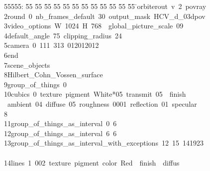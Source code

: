 %
%
\begin{tabbing}
55555: \= 55 \= 55 \= 55 \= 55 \= 55 \= 55 \= 55 \= 55 \= 55 \= 55 \= 55 \= 55 \= \>\>orbiterout\ v\ 2\ povray\ \\[0pt]
2\>\>\>round\ 0\ nb\_frames\_default\ 30\ output\_mask\ HCV\_d\_03dpov\ \\[0pt]
3\>\>\>video\_options\ W\ 1024\ H\ 768\ \ global\_picture\_scale\ 09\ \\[0pt]
4\>\>\>default\_angle\ 75\ clipping\_radius\ 24\ \\[0pt]
5\>\>\>camera\ 0\ 111\ 313\ 012012012\ \ \\[0pt]
6\>\>\>end\ \\[0pt]
7\>\>\>scene\_objects\ \\[0pt]
8\>\>\>\>Hilbert\_Cohn\_Vossen\_surface\ \\[0pt]
9\>\>\>\>group\_of\_things\ 0\ \\[0pt]
10\>\>\>\>cubics\ 0\ texture\ pigment\ White*05\ transmit\ 05\ \ finish\\[0pt]
\>\ ambient\ 04\ diffuse\ 05\ roughness\ 0001\ reflection\ 01\ specular\ \\[0pt]
\>8\ \ \\[0pt]
11\>\>\>\>group\_of\_things\_as\_interval\ 0\ 6\ \\[0pt]
12\>\>\>\>group\_of\_things\_as\_interval\ 6\ 6\ \\[0pt]
13\>\>\>\>group\_of\_things\_as\_interval\_with\_exceptions\ 12\ 15\ 141923\\[0pt]
\>\ \\[0pt]
14\>\>\>\>lines\ 1\ 002\ texture\ pigment\ color\ Red\ \ finish\ \ diffus\\[0pt]

\end{tabbing}

